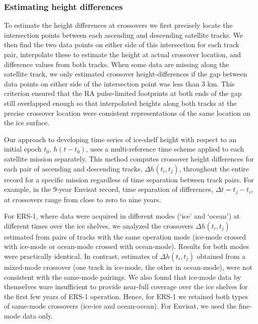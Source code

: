 \subsubsection{Estimating height differences}

To estimate the height differences at crossovers we first precisely locate the intersection points between each ascending and descending satellite tracks. We then find the two data points on either side of this intersection for each track pair, interpolate these to estimate the height at actual crossover location, and difference values from both tracks. When some data are missing along the satellite track, we only estimated crossover height-differences if the gap between data points on either side of the intersection point was less than 3 km. This criterion ensured that the RA pulse-limited footprints at both ends of the gap still overlapped enough so that interpolated heights along both tracks at the precise crossover location were consistent representations of the same location on the ice surface.

Our approach to developing time series of ice-shelf height with respect to an initial epoch $t_0$, $h(t-t_0)$, uses a multi-reference time scheme \parencite{Khvorostovsky2012, Li2006} applied to each satellite mission separately. This method computes crossover height differences for each pair of ascending and descending tracks, $\Delta h(t_i,t_j)$, throughout the entire record for a specific mission regardless of time separation between track pairs. For example, in the 9-year Envisat record, time separation of differences, $\Delta t=t_j-t_i$, at crossovers range from close to zero to nine years. 

For ERS-1, where data were acquired in different modes (`ice' and `ocean') at different times over the ice shelves, we analyzed the crossovers $\Delta h(t_i,t_j)$ estimated from pairs of tracks with the same operation mode (ice-mode crossed with ice-mode or ocean-mode crossed with ocean-mode). Results for both modes were practically identical. In contrast, estimates of $\Delta h(t_i,t_j)$ obtained from a mixed-mode crossover (one track in ice-mode, the other in ocean-mode), were not consistent with the same-mode pairings. We also found that ice-mode data by themselves ware insufficient to provide near-full coverage over the ice shelves for the first few years of ERS-1 operation. Hence, for ERS-1 we retained both types of same-mode crossovers (ice-ice and ocean-ocean). For Envisat, we used the fine-mode data only. 

